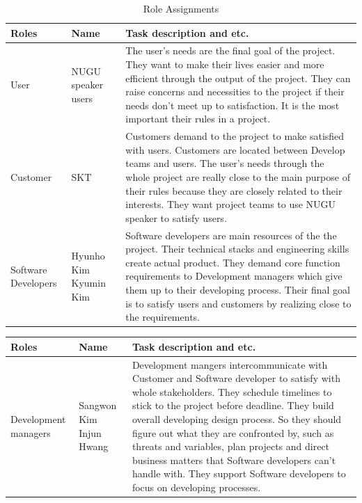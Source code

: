 \documentclass[conference]{IEEEtran}
\begin{document}
  \begin{table}[htbp]
  \renewcommand{\arraystretch}{1.7}
\caption{Role Assignments}
\begin{center}
\begin{tabular}{|p{1.5cm}|p{1.8cm}|p{4.2cm}|}
\hline
\textbf{Roles} & \textbf{{Name}}& \textbf{{Task description and etc.}} \\
\hline
User & NUGU speaker users & The user’s needs are the final goal of the project. They want to make their lives easier and more efficient through the output of the project. They can raise concerns and necessities to the project if their needs don’t meet up to satisfaction. It is the most important their rules in a project.  \\
\hline
Customer & SKT & Customers demand to the project to make satisfied with users. Customers are located between Develop teams and users. The user’s needs through the whole project are really close to the main purpose of their rules because they are closely related to their interests. They want project teams to use NUGU speaker to satisfy users.  \\
\hline
Software \linebreak Developers& Hyunho Kim \linebreak Kyumin Kim& Software developers are main resources of the the project. Their technical stacks and engineering skills create actual product. They demand core function requirements to Development managers which give them up to their developing process. Their final goal is to satisfy users and customers by realizing close to the requirements. \\
\hline
\end{tabular}
\label{tab1}
\end{center}
\end{table}

  \begin{table}[htbp]
  \renewcommand{\arraystretch}{1.7}
\begin{center}
\begin{tabular}{|p{1.5cm}|p{1.8cm}|p{4.2cm}|}
\hline
\textbf{Roles} & \textbf{{Name}}& \textbf{{Task description and etc.}} \\
\hline

Development \linebreak managers& Sangwon Kim \linebreak Injun Hwang& Development mangers intercommunicate with Customer and Software developer to satisfy with whole stakeholders. They schedule timelines to stick to the project before deadline. They build overall developing design process. So they should figure out what they are confronted by, such as threats and variables, plan projects and direct business matters that Software developers can’t handle with. They support Software developers to focus on developing processes. \\
\hline
\end{tabular}
\label{tab1}
\end{center}
\end{table}
\end{document}
